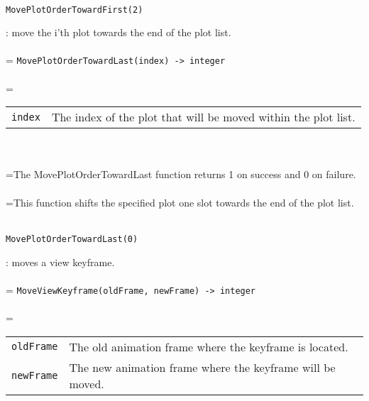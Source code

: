 \documentclass[10pt,a4paper]{report}
\begin{document}
\\[-6mm]
\begin{verbatim}MovePlotOrderTowardFirst(2)
\end{verbatim}
\newpage


{}
: move the i'th plot towards the end of the plot list.\\[-3mm]

 \\ 
\hangindent=\parindent 
\verb!MovePlotOrderTowardLast(index) -> integer!\\ [-3mm]

 \\ 
\hangindent=\parindent 
\begin{tabular}{lp{9cm}}
\verb!index! & The index of the plot that will be moved within the plot list. \\
\end{tabular} \\[-2mm]


 \\ 
\hangindent=\parindent The MovePlotOrderTowardLast function returns 1 on success and 0 on failure. \\[-3mm] 

 \\ 
\hangindent=\parindent This function shifts the specified plot one slot towards the end of the plot list. \\[-3mm] 

\\[-6mm]
\begin{verbatim}MovePlotOrderTowardLast(0)
\end{verbatim}
\newpage


{}
: moves a view keyframe.\\[-3mm]

 \\ 
\hangindent=\parindent 
\verb!MoveViewKeyframe(oldFrame, newFrame) -> integer!\\ [-3mm]

 \\ 
\hangindent=\parindent 
\begin{tabular}{lp{9cm}}
\verb!oldFrame! & The old animation frame where the keyframe is located. \\
\verb!newFrame! & The new animation frame where the keyframe will be moved. \\
\end{tabular} \\[-2mm]
\end{document}
